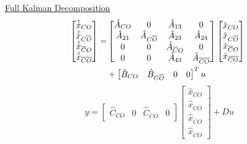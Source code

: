 \documentclass[twocolumn]{article}    %
\begin{document}
\newpage
\noindent
\underline{Full Kalman Decomposition}
    \begin{align*}
        \hspace{-5pt}
        \begin{bmatrix}
            \hat{\Dot{x}}_{CO}\\ 
            \hat{\Dot{x}}_{C\overline{O}}\\
            \hat{\Dot{x}}_{\overline{C}O}\\
            \hat{\Dot{x}}_{\overline{CO}}\\
        \end{bmatrix} =& \begin{bmatrix}
            \hat{A}_{CO} & 0 & \hat{A}_{13} & 0 \\
            \hat{A}_{21} & \hat{A}_{C\overline{O}} & \hat{A}_{23} & \hat{A}_{24} \\
            0 & 0 & \hat{A}_{\overline{C}O} & 0\\
            0 & 0 &\hat{A}_{43} & \hat{A}_{\overline{CO}}
        \end{bmatrix} \begin{bmatrix}
            \hat{x}_{CO}\\ 
            \hat{x}_{C\overline{O}}\\
            \hat{x}_{\overline{C}O}\\
            \hat{x}_{\overline{CO}}
        \end{bmatrix}\\
        &+ \begin{bmatrix}
            \hat{B}_{CO} & 
            \hat{B}_{C\overline{O}} &  0 & 0
        \end{bmatrix}^T u
    \end{align*}
    \begin{equation*}
        y = \begin{bmatrix}
            \hat{C}_{CO} & 0 & \hat{C}_{\overline{C}O} & 0 
        \end{bmatrix} \begin{bmatrix}
            \hat{x}_{CO}\\ 
            \hat{x}_{C\overline{O}}\\
            \hat{x}_{\overline{C}O}\\
            \hat{x}_{\overline{CO}}
        \end{bmatrix} + Du
    \end{equation*}
    
\end{document}
